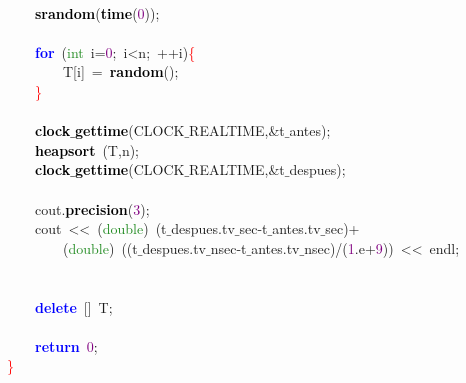 \mbox{}\ \ \ \  \\
\mbox{}\ \ \ \ \textbf{\textcolor{Black}{srandom}}\textcolor{BrickRed}{(}\textbf{\textcolor{Black}{time}}\textcolor{BrickRed}{(}\textcolor{Purple}{0}\textcolor{BrickRed}{));} \\
\mbox{}\ \ \ \  \\
\mbox{}\ \ \ \ \textbf{\textcolor{Blue}{for}}\ \textcolor{BrickRed}{(}\textcolor{ForestGreen}{int}\ i\textcolor{BrickRed}{=}\textcolor{Purple}{0}\textcolor{BrickRed}{;}\ i\textcolor{BrickRed}{\textless{}}n\textcolor{BrickRed}{;}\ \textcolor{BrickRed}{++}i\textcolor{BrickRed}{)}\textcolor{Red}{\{} \\
\mbox{}\ \ \ \ \ \ \ \ T\textcolor{BrickRed}{[}i\textcolor{BrickRed}{]}\ \textcolor{BrickRed}{=}\ \textbf{\textcolor{Black}{random}}\textcolor{BrickRed}{();} \\
\mbox{}\ \ \ \ \textcolor{Red}{\}} \\
\mbox{}\ \ \ \  \\
\mbox{}\ \ \ \ \textbf{\textcolor{Black}{clock$\_$gettime}}\textcolor{BrickRed}{(}CLOCK$\_$REALTIME\textcolor{BrickRed}{,\&}t$\_$antes\textcolor{BrickRed}{);} \\
\mbox{}\ \ \ \ \textbf{\textcolor{Black}{heapsort}}\ \textcolor{BrickRed}{(}T\textcolor{BrickRed}{,}n\textcolor{BrickRed}{);} \\
\mbox{}\ \ \ \ \textbf{\textcolor{Black}{clock$\_$gettime}}\textcolor{BrickRed}{(}CLOCK$\_$REALTIME\textcolor{BrickRed}{,\&}t$\_$despues\textcolor{BrickRed}{);} \\
\mbox{}\ \ \ \  \\
\mbox{}\ \ \ \ cout\textcolor{BrickRed}{.}\textbf{\textcolor{Black}{precision}}\textcolor{BrickRed}{(}\textcolor{Purple}{3}\textcolor{BrickRed}{);} \\
\mbox{}\ \ \ \ cout\ \textcolor{BrickRed}{\textless{}\textless{}}\ \textcolor{BrickRed}{(}\textcolor{ForestGreen}{double}\textcolor{BrickRed}{)}\ \textcolor{BrickRed}{(}t$\_$despues\textcolor{BrickRed}{.}tv$\_$sec\textcolor{BrickRed}{-}t$\_$antes\textcolor{BrickRed}{.}tv$\_$sec\textcolor{BrickRed}{)+} \\
\mbox{}\ \ \ \ \ \ \ \ \textcolor{BrickRed}{(}\textcolor{ForestGreen}{double}\textcolor{BrickRed}{)}\ \textcolor{BrickRed}{((}t$\_$despues\textcolor{BrickRed}{.}tv$\_$nsec\textcolor{BrickRed}{-}t$\_$antes\textcolor{BrickRed}{.}tv$\_$nsec\textcolor{BrickRed}{)/(}\textcolor{Purple}{1}\textcolor{BrickRed}{.}e\textcolor{BrickRed}{+}\textcolor{Purple}{9}\textcolor{BrickRed}{))}\ \textcolor{BrickRed}{\textless{}\textless{}}\ endl\textcolor{BrickRed}{;} \\
\mbox{} \\
\mbox{}\ \ \ \  \\
\mbox{}\ \ \ \ \textbf{\textcolor{Blue}{delete}}\ \textcolor{BrickRed}{[]}\ T\textcolor{BrickRed}{;} \\
\mbox{}\ \ \ \  \\
\mbox{}\ \ \ \ \textbf{\textcolor{Blue}{return}}\ \textcolor{Purple}{0}\textcolor{BrickRed}{;} \\
\mbox{}\textcolor{Red}{\}} \\
\mbox{}
